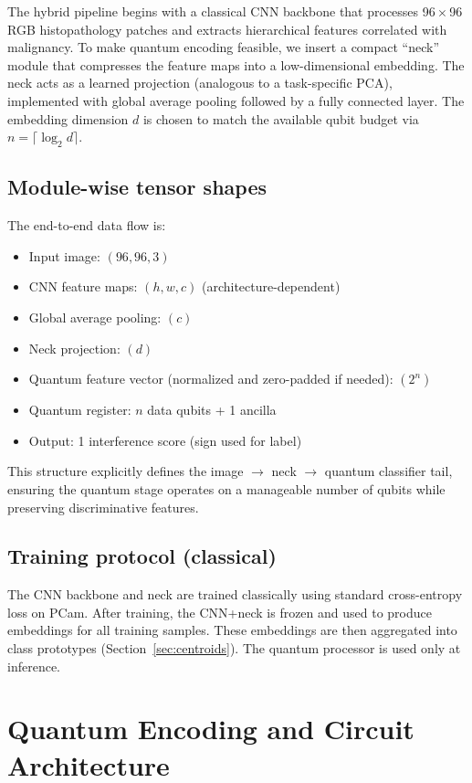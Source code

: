 \documentclass[conference]{IEEEtran}
\begin{document}
The hybrid pipeline begins with a classical CNN backbone that processes 96\,$\times$\,96 RGB histopathology patches and extracts hierarchical features correlated with malignancy. To make quantum encoding feasible, we insert a compact ``neck'' module that compresses the feature maps into a low-dimensional embedding. The neck acts as a learned projection (analogous to a task-specific PCA), implemented with global average pooling followed by a fully connected layer. The embedding dimension $d$ is chosen to match the available qubit budget via $n = \lceil \log_2 d \rceil$.

\subsection{Module-wise tensor shapes}
The end-to-end data flow is:
\begin{itemize}
    \item Input image: $(96, 96, 3)$
    \item CNN feature maps: $(h, w, c)$ (architecture-dependent)
    \item Global average pooling: $(c)$
    \item Neck projection: $(d)$
    \item Quantum feature vector (normalized and zero-padded if needed): $(2^n)$
    \item Quantum register: $n$ data qubits + 1 ancilla
    \item Output: 1 interference score (sign used for label)
\end{itemize}

This structure explicitly defines the image \(\rightarrow\) neck \(\rightarrow\) quantum classifier tail, ensuring the quantum stage operates on a manageable number of qubits while preserving discriminative features.

\subsection{Training protocol (classical)}
The CNN backbone and neck are trained classically using standard cross-entropy loss on PCam. After training, the CNN+neck is frozen and used to produce embeddings for all training samples. These embeddings are then aggregated into class prototypes (Section~\ref{sec:centroids}). The quantum processor is used only at inference.


\section{Quantum Encoding and Circuit Architecture}
\end{document}

